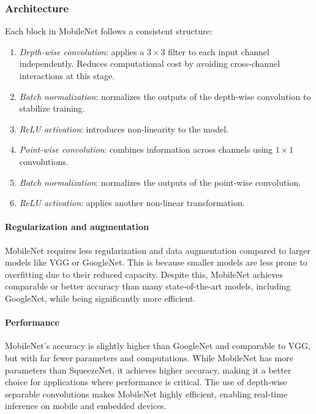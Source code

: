 \subsubsection{Architecture}
Each block in MobileNet follows a consistent structure:
\begin{enumerate}
    \item \textit{Depth-wise convolution}: applies a $3\times 3$ filter to each input channel independently.
        Reduces computational cost by avoiding cross-channel interactions at this stage.
    \item \textit{Batch normalization}: normalizes the outputs of the depth-wise convolution to stabilize training.
    \item \textit{ReLU activation}: introduces non-linearity to the model.
    \item \textit{Point-wise convolution}: combines information across channels using $1\times 1$ convolutions.
    \item \textit{Batch normalization}: normalizes the outputs of the point-wise convolution.
    \item \textit{ReLU activation}: applies another non-linear transformation.
\end{enumerate}

\paragraph*{Regularization and augmentation}
MobileNet requires less regularization and data augmentation compared to larger models like VGG or GoogleNet. 
This is because smaller models are less prone to overfitting due to their reduced capacity. 
Despite this, MobileNet achieves comparable or better accuracy than many state-of-the-art models, including GoogleNet, while being significantly more efficient.

\paragraph*{Performance}
MobileNet's accuracy is slightly higher than GoogleNet and comparable to VGG, but with far fewer parameters and computations.
While MobileNet has more parameters than SqueezeNet, it achieves higher accuracy, making it a better choice for applications where performance is critical.
The use of depth-wise separable convolutions makes MobileNet highly efficient, enabling real-time inference on mobile and embedded devices.

